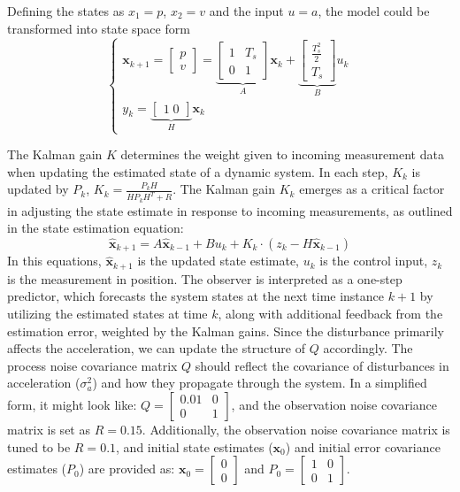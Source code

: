 Defining the states as $x_1 = p$, $x_2 = v$ and the input $u = a$, the model could be transformed into state space form
\begin{equation}
    \begin{cases} 
    \mathbf{x}_{k+1} = \begin{bmatrix}p \\v \end{bmatrix} = \underbrace{\begin{bmatrix}1 & T_s \\0 & 1\end{bmatrix}}_{A} \mathbf{x}_k + \underbrace{\begin{bmatrix}\frac{T_s^2}{2}  \\T_s \end{bmatrix}}_{B} u_k \\
    y_k = \underbrace{\begin{bmatrix}1\;0\end{bmatrix}}_{H} \mathbf{x}_k
    \end{cases}
    \label{eq:kf_state}
\end{equation}

The Kalman gain $K$ determines the weight given to incoming measurement data when updating the estimated state of a dynamic system. In each step, $K_k$ is updated by $P_k$, $K_k=\frac{P_kH}{HP_kH^T+R}$. The Kalman gain $K_k$ emerges as a critical factor in adjusting the state estimate in response to incoming measurements, as outlined in the state estimation equation:
\begin{equation}
    \hat{\mathbf{x}}_{k+1} = A\hat{\mathbf{x}}_{k-1} + Bu_k + K_k\cdot(z_k - H\hat{\mathbf{x}}_{k-1})
    \label{eq:kf_est}
\end{equation} 
In this equations, $\hat{\mathbf{x}}_{k+1}$ is the updated state estimate, $u_k$ is the control input, $z_k$ is the measurement in position. The observer is interpreted as a one-step predictor, which forecasts the system states at the next time instance $k+1$ by utilizing the estimated states at time $k$, along with additional feedback from the estimation error, weighted by the Kalman gains. Since the disturbance primarily affects the acceleration, we can update the structure of $Q$ accordingly. The process noise covariance matrix $Q$ should reflect the covariance of disturbances in acceleration ($\sigma_a^2$) and how they propagate through the system. In a simplified form, it might look like: $Q = \begin{bmatrix}0.01 & 0 \\0 & 1\end{bmatrix}$, and the observation noise covariance matrix is set as $R = 0.15$. Additionally, the observation noise covariance matrix is tuned to be $R = 0.1$, and initial state estimates ($\mathbf{x}_0$) and initial error covariance estimates ($P_0$) are provided as: $\mathbf{x}_0 = \begin{bmatrix} 0 \\ 0 \end{bmatrix}$ and $P_0 = \begin{bmatrix}1 & 0 \\0 & 1\end{bmatrix}$. 

